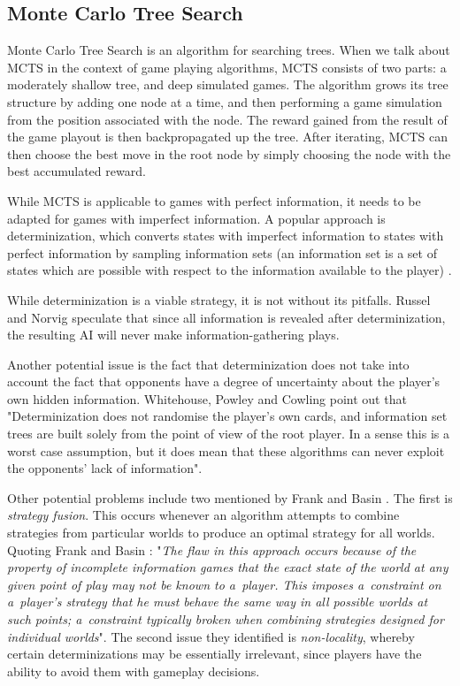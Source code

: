 \subsection{Monte Carlo Tree Search}
\label{rw:mcts}

Monte Carlo Tree Search \cite{Chaslot10} is an algorithm for searching trees.
When we talk about MCTS in the context of game playing algorithms, MCTS
consists of two parts: a moderately shallow tree, and deep simulated games.
The algorithm grows its tree structure by adding one node at a time, and then
performing a game simulation from the position associated with the node.
The reward gained from the result of the game playout is then backpropagated
up the tree. After iterating, MCTS can then choose the best move in the root
node by simply choosing the node with the best accumulated reward.

While MCTS is applicable to games with perfect information, it needs to be adapted
for games with imperfect information. A popular approach is determinization,
which converts states with imperfect information to states with perfect information
by sampling information sets (an information set is a set of states
which are possible with respect to the information available to the player)
\cite{Cowling12}.

While determinization is a viable strategy, it is not without its pitfalls.
Russel and Norvig \cite{Russell09} speculate that since all information is revealed after
determinization, the resulting AI will never make information-gathering
plays.

Another potential issue is the fact that determinization does not take into account
the fact that opponents have a degree of uncertainty about the player's own hidden information.
Whitehouse, Powley and Cowling \cite{Whitehouse11} point out that "Determinization
does not randomise the player's own cards, and information set trees are built solely
from the point of view of the root player. In a sense this is a
worst case assumption, but it does mean that these
algorithms can never exploit the opponents' lack of
information".

Other potential problems include two mentioned by Frank and Basin \cite{Frank98}.
The first is \emph{strategy fusion}. This occurs whenever an algorithm attempts to combine
strategies from particular worlds to produce an optimal strategy for all worlds.
Quoting Frank and Basin \cite{Frank98}: "\emph{The flaw in this approach
occurs because of the property of incomplete information games that the exact state
of the world at any given point of play may not be known to a~player. This imposes
a~constraint on a~player's strategy that he must behave the same way in all possible
worlds at such points; a~constraint typically broken when combining strategies designed
for individual worlds}". The second issue they identified is \emph{non-locality},
whereby certain determinizations may be essentially irrelevant, since players have
the ability to avoid them with gameplay decisions.

